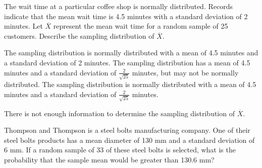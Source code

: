 \documentclass[noanswers]{exam}
\begin{document}
\begin{questions}

\newpage

\question The wait time at a particular coffee shop is normally distributed. Records indicate that the mean wait time is 4.5 minutes with a standard deviation of 2 minutes. Let $\overline{X}$ represent the mean wait time for a random sample of 25 customers. Describe the sampling distribution of $\overline{X}$.

\vspace{3mm}
\begin{choices}
	\choice The sampling distribution is normally distributed with a mean of 4.5 minutes and a standard deviation of 2 minutes.
	\choice The sampling distribution has a mean of 4.5 minutes and a standard deviation of $\frac{2}{\sqrt{25}}$ minutes, but may not be normally distributed.
	\CorrectChoice The sampling distribution is normally distributed with a mean of 4.5 minutes and a standard deviation of $\frac{2}{\sqrt{25}}$ minutes.
	
	\choice There is not enough information to determine the sampling distribution of $\overline{X}$.
\end{choices}
\vspace{3mm}

\question Thompson and Thompson is a steel bolts manufacturing company. One of their steel bolts products has a mean diameter of 130 mm and a standard deviation of 6 mm. If a random sample of 33 of these steel bolts is selected, what is the probability that the sample mean would be greater than 130.6 mm?

\vspace{3mm}

\begin{choices}
\end{choices}


\end{questions}
\end{document}
